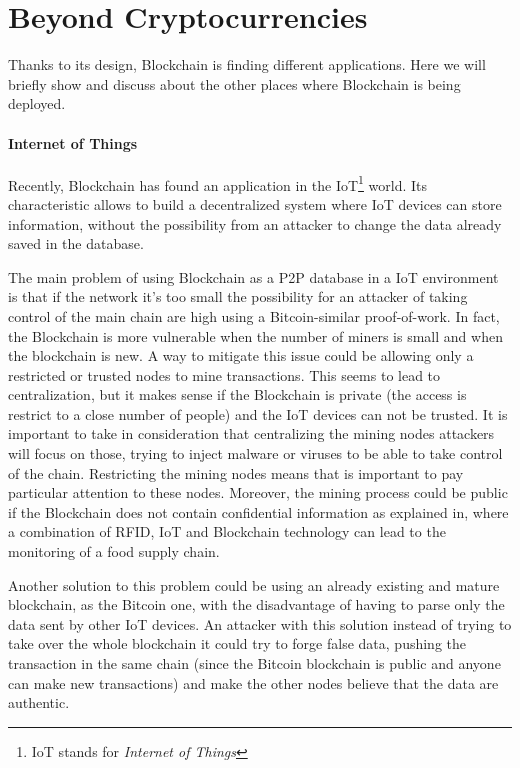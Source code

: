 \section{Beyond Cryptocurrencies}
\label{sec:beyond_crypto}

Thanks to its design, Blockchain is finding different applications. Here
we will briefly show and discuss about the other places where Blockchain
is being deployed.

\paragraph*{Internet of Things}

Recently, Blockchain has found an application in the IoT\footnote{IoT stands
for \textit{Internet of Things}} world\cite{politecnico16}. Its characteristic
allows to build a decentralized system where IoT devices can store information,
without the possibility from an attacker to change the data already saved in
the database\cite{politecnico16}.

The main problem of using Blockchain as a P2P database in a IoT environment is
that if the network it's too small the possibility for an attacker of taking
control of the main chain are high using a Bitcoin-similar proof-of-work. In
fact, the Blockchain is more vulnerable when the number of miners is small and
when the blockchain is new. A way to mitigate this issue could be allowing only
a restricted or trusted nodes to mine transactions. This seems to lead to
centralization, but it makes sense if the Blockchain is private (the access is
restrict to a close number of people) and the IoT devices can not be trusted.
It is important to take in consideration that centralizing the mining nodes
attackers will focus on those, trying to inject malware or viruses to be able to
take control of the chain. Restricting the mining nodes means that is important
to pay particular attention to these nodes.
Moreover, the mining process could be public if the Blockchain does not contain
confidential information as explained in\cite{tian17}, where a combination of
RFID, IoT and Blockchain technology can lead to the monitoring of a food supply
chain.

Another solution to this problem could be using an already existing and mature
blockchain, as the Bitcoin one, with the disadvantage of having to parse only
the data sent by other IoT devices. An attacker with this solution instead of
trying to take over the whole blockchain it could try to forge false data,
pushing the transaction in the same chain (since the Bitcoin blockchain is
public and anyone can make new transactions) and make the other nodes believe
that the data are authentic.

